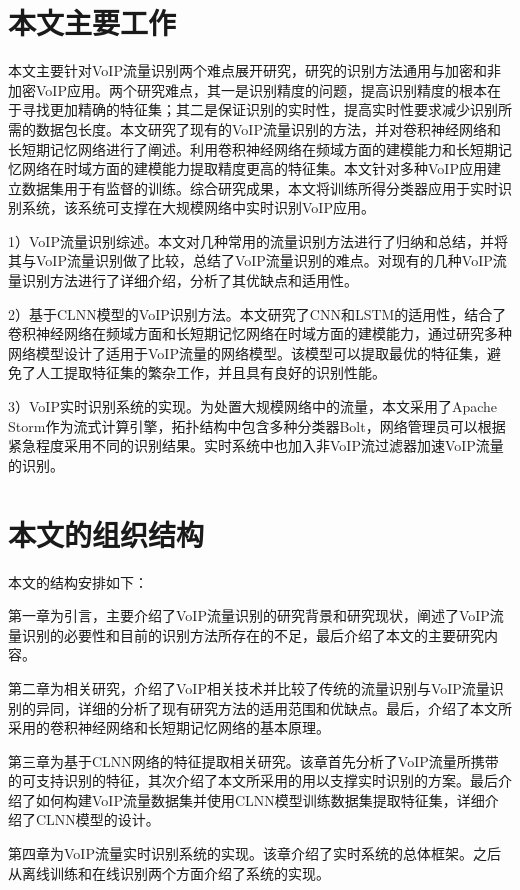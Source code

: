 \section{本文主要工作}

本文主要针对VoIP流量识别两个难点展开研究，研究的识别方法通用与加密和非加密VoIP应用。两个研究难点，其一是识别精度的问题，提高识别精度的根本在于寻找更加精确的特征集；其二是保证识别的实时性，提高实时性要求减少识别所需的数据包长度。本文研究了现有的VoIP流量识别的方法，并对卷积神经网络和长短期记忆网络进行了阐述。利用卷积神经网络在频域方面的建模能力和长短期记忆网络在时域方面的建模能力提取精度更高的特征集。本文针对多种VoIP应用建立数据集用于有监督的训练。综合研究成果，本文将训练所得分类器应用于实时识别系统，该系统可支撑在大规模网络中实时识别VoIP应用。

1）VoIP流量识别综述。本文对几种常用的流量识别方法进行了归纳和总结，并将其与VoIP流量识别做了比较，总结了VoIP流量识别的难点。对现有的几种VoIP流量识别方法进行了详细介绍，分析了其优缺点和适用性。

2）基于CLNN模型的VoIP识别方法。本文研究了CNN和LSTM的适用性，结合了卷积神经网络在频域方面和长短期记忆网络在时域方面的建模能力，通过研究多种网络模型设计了适用于VoIP流量的网络模型。该模型可以提取最优的特征集，避免了人工提取特征集的繁杂工作，并且具有良好的识别性能。

3）VoIP实时识别系统的实现。为处置大规模网络中的流量，本文采用了Apache Storm作为流式计算引擎，拓扑结构中包含多种分类器Bolt，网络管理员可以根据紧急程度采用不同的识别结果。实时系统中也加入非VoIP流过滤器加速VoIP流量的识别。

\section{本文的组织结构}
本文的结构安排如下：

第一章为引言，主要介绍了VoIP流量识别的研究背景和研究现状，阐述了VoIP流量识别的必要性和目前的识别方法所存在的不足，最后介绍了本文的主要研究内容。

第二章为相关研究，介绍了VoIP相关技术并比较了传统的流量识别与VoIP流量识别的异同，详细的分析了现有研究方法的适用范围和优缺点。最后，介绍了本文所采用的卷积神经网络和长短期记忆网络的基本原理。

第三章为基于CLNN网络的特征提取相关研究。该章首先分析了VoIP流量所携带的可支持识别的特征，其次介绍了本文所采用的用以支撑实时识别的方案。最后介绍了如何构建VoIP流量数据集并使用CLNN模型训练数据集提取特征集，详细介绍了CLNN模型的设计。

第四章为VoIP流量实时识别系统的实现。该章介绍了实时系统的总体框架。之后从离线训练和在线识别两个方面介绍了系统的实现。

